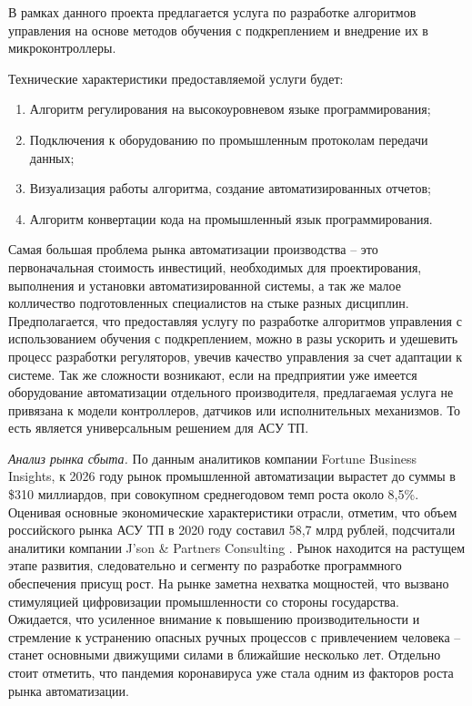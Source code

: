 В рамках данного проекта предлагается услуга по разработке алгоритмов управления на основе методов обучения с подкреплением и внедрение их в микроконтроллеры. 

Технические характеристики предоставляемой услуги будет:
\begin{enumerate}[1.]
	\item Алгоритм регулирования на высокоуровневом языке программирования;
	\item Подключения к оборудованию по промышленным протоколам передачи данных;
	\item Визуализация работы алгоритма, создание автоматизированных отчетов;
	\item Алгоритм конвертации кода на промышленный язык программирования.
\end{enumerate}

Самая большая проблема рынка автоматизации производства -- это первоначальная стоимость инвестиций, необходимых для проектирования, выполнения и установки автоматизированной системы, а так же малое колличество подготовленных специалистов на стыке разных дисциплин. Предполагается, что предоставляя услугу по разработке алгоритмов управления с использованием обучения с подкреплением, можно в разы ускорить и удешевить процесс разработки регуляторов, увечив качество управления за счет адаптации к системе.
Так же сложности возникают, если на предприятии уже имеется оборудование автоматизации отдельного производителя, предлагаемая услуга не привязана к модели контроллеров, датчиков или исполнительных механизмов. То есть является универсальным решением для АСУ ТП.


\textit{Анализ рынка сбыта.} По данным аналитиков компании Fortune Business Insights, к 2026 году рынок промышленной автоматизации вырастет до суммы в \$310 миллиардов, при совокупном среднегодовом темп роста около 8,5\%.
Оценивая основные экономические характеристики отрасли, отметим, что объем российского рынка АСУ ТП в 2020 году составил 58,7 млрд рублей, подсчитали аналитики компании J’son \& Partners Consulting \cite{eco_1}. Рынок находится на растущем этапе развития, следовательно и сегменту по разработке программного обеспечения присущ рост. На рынке заметна нехватка мощностей, что вызвано стимуляцией цифровизации промышленности со стороны государства. 
Ожидается, что усиленное внимание к повышению производительности и стремление к устранению опасных ручных процессов с привлечением человека -- станет основными движущими силами в ближайшие несколько лет. Отдельно стоит отметить, что пандемия коронавируса уже стала одним из факторов роста рынка автоматизации.

